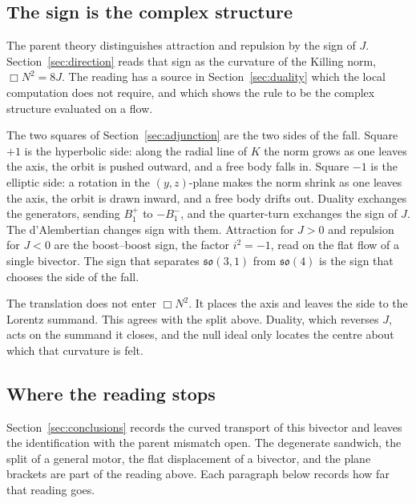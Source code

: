 \documentclass[a4paper]{article}
\begin{document}
\subsection{The sign is the complex structure}

The parent theory distinguishes attraction and repulsion by the sign of \(J\). Section~\ref{sec:direction} reads that sign as the curvature of the Killing norm, \(\Box N^{2}=8J\). The reading has a source in Section~\ref{sec:duality} which the local computation does not require, and which shows the rule to be the complex structure evaluated on a flow.

The two squares of Section~\ref{sec:adjunction} are the two sides of the fall. Square \(+1\) is the hyperbolic side: along the radial line of \(K\) the norm grows as one leaves the axis, the orbit is pushed outward, and a free body falls in. Square \(-1\) is the elliptic side: a rotation in the \((y,z)\)-plane makes the norm shrink as one leaves the axis, the orbit is drawn inward, and a free body drifts out. Duality exchanges the generators, sending \(B^{+}_{1}\) to \(-B^{-}_{1}\), and the quarter-turn exchanges the sign of \(J\). The d'Alembertian changes sign with them. Attraction for \(J>0\) and repulsion for \(J<0\) are the boost--boost sign, the factor \(i^{2}=-1\), read on the flat flow of a single bivector. The sign that separates \(\mathfrak{so}(3,1)\) from \(\mathfrak{so}(4)\) is the sign that chooses the side of the fall.

The translation does not enter \(\Box N^{2}\). It places the axis and leaves the side to the Lorentz summand. This agrees with the split above. Duality, which reverses \(J\), acts on the summand it closes, and the null ideal only locates the centre about which that curvature is felt.

\subsection{Where the reading stops}

Section~\ref{sec:conclusions} records the curved transport of this bivector and leaves the identification with the parent mismatch open. The degenerate sandwich, the split of a general motor, the flat displacement of a bivector, and the plane brackets are part of the reading above. Each paragraph below records how far that reading goes.
\end{document}
